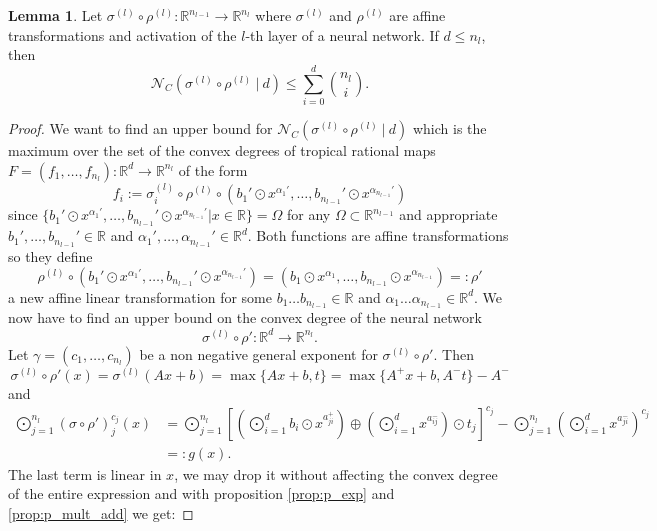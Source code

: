 \documentclass{article}
\theoremstyle{definition}
\newtheorem{lemma}[theorem]{Lemma}
\begin{document}
\begin{lemma}\hspace{1sp}\cite{zhang2018tropical}\label{lem:bound}
Let $\sigma^{(l)} \circ \rho^{(l)}: \mathbb{R}^{n_{l-1}} \to \mathbb{R}^{n_l}$ where $\sigma^{(l)}$ and $\rho^{(l)}$ are affine transformations and activation of the $l$-th layer of a neural network. If $d \leq n_l$, then
$$\mathcal{N}_C(\sigma^{(l)} \circ \rho^{(l)} \ | \ d) \leq \displaystyle\sum_{i=0}^{d}\binom{n_l}{i}.$$
\end{lemma}
\begin{proof}
We want to find an upper bound for $\mathcal{N}_C(\sigma^{(l)} \circ \rho^{(l)} \ | \ d)$ which is the maximum over the set of the convex degrees of tropical rational maps $F = (f_1, \dots , f_{n_{l}}): \mathbb{R}^{d} \to \mathbb{R}^{n_l}$ of the form
$$f_i := \sigma_{i}^{(l)} \circ \rho^{(l)} \circ (b_1' \odot x^{\alpha_1'}, \dots , b_{n_{l-1}}' \odot x^{\alpha_{n_{l-1}}'})$$ since $\{b_1' \odot x^{\alpha_1'}, \dots , b_{n_{l-1}}' \odot x^{\alpha_{n_{l-1}}'} | x \in \mathbb{R}\} = \Omega$ for any $\Omega \subset \mathbb{R}^{n_{l-1}}$ and appropriate $b_1', \dots , b_{n_{l-1}}' \in \mathbb{R}$ and $\alpha_1', \dots , \alpha_{n_{l-1}}' \in \mathbb{R}^{d}$. Both functions are affine transformations so they define
$$\rho^{(l)} \circ (b_1' \odot x^{\alpha_1'}, \dots , b_{n_{l-1}}' \odot x^{\alpha_{n_{l-1}}'}) = (b_1 \odot x^{\alpha_1}, \dots , b_{n_{l-1}} \odot x^{\alpha_{n_{l-1}}}) =: \rho'$$
a new affine linear transformation for some $b_1 \dots b_{n_{l-1}} \in \mathbb{R}$ and $\alpha_1 \dots \alpha_{n_{l-1}} \in \mathbb{R}^{d}$.
We now have to find an upper bound on the convex degree of the neural network
$$\sigma^{(l)} \circ \rho': \mathbb{R}^{d} \to \mathbb{R}^{n_l}.$$
Let $\gamma = (c_1, \dots , c_{n_l})$ be a non negative general exponent for $\sigma^{(l)} \circ \rho'$. Then
$$\sigma^{(l)} \circ \rho'(x) = \sigma^{(l)}(Ax+b) = \max\{Ax+b, t\} = \max\{A^{+}x+b,A^{-}t\}-A^{-}$$
and
\begin{align*}
\displaystyle\bigodot_{j=1}^{n_l}(\sigma \circ \rho')_{j}^{c_j}(x) &= \displaystyle\bigodot_{j=1}^{n_l}\left[\left(\displaystyle\bigodot^{d}_{i=1}b_i \odot x^{a^{+}_{ji}}\right) \oplus \left( \displaystyle\bigodot_{i=1}^{d} x^{a_{ij}^{-}} \right) \odot t_j\right]^{c_j} - \displaystyle\bigodot^{n_l}_{j=1}\left(\displaystyle\bigodot_{i=1}^{d} x^{a_{ji}^{-}}\right)^{c_j} \\
&=: g(x).
\end{align*}
The last term is linear in $x$, we may drop it without affecting the convex degree of the entire expression and with proposition \ref{prop:p_exp} and \ref{prop:p_mult_add} we get:

\end{proof}
\end{document}
